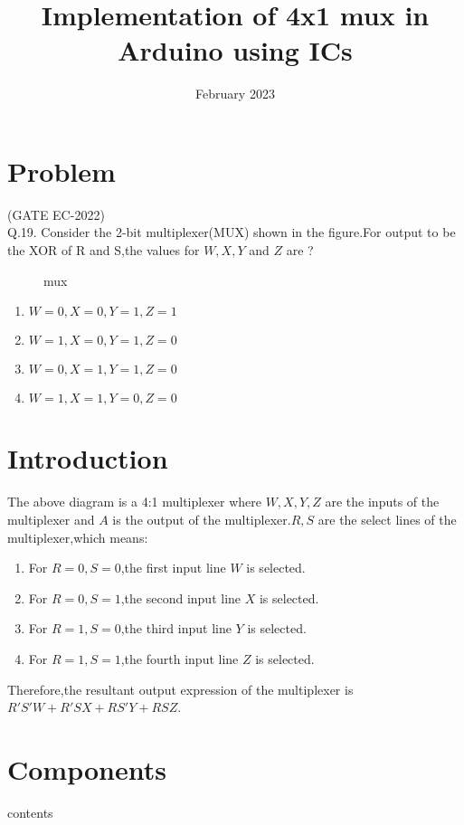 \documentclass[12pt]{article}
\title{Implementation of 4x1 mux in Arduino using ICs}
\date{February 2023}
\begin{document}
\maketitle
\tableofcontents

	 \section{Problem}
	 (GATE EC-2022)\\

Q.19. Consider the 2-bit multiplexer(MUX) shown in the figure.For output to be the XOR of R and S,the values for $ W,X,Y$ and $Z$ are ?\newline
\begin{figure}[h]

\caption{mux}
\label{fig:1}
\end{figure}
\begin{enumerate}
\item $W = 0, X = 0, Y = 1, Z = 1$
\item $W = 1, X = 0, Y = 1, Z = 0$
\item $W = 0, X = 1, Y = 1, Z = 0$
\item $W = 1, X = 1, Y = 0, Z = 0$
\end{enumerate}
\section{Introduction}
	The above diagram is a 4:1 multiplexer where $W, X, Y, Z$ are the inputs of the multiplexer and $A$ is the output of the multiplexer.$R , S$ are the select lines of the multiplexer,which means:\newline
\begin{enumerate}
\item For $R = 0,S = 0$,the first input line $W$ is selected.
\item For $R = 0,S = 1$,the second input line $X$ is selected.
\item For $R = 1,S = 0$,the third input line $Y$ is selected.
\item For $R = 1,S = 1$,the fourth input line $Z$ is selected.
\end{enumerate}
Therefore,the resultant output expression of the multiplexer is $R'S'W + R'SX + RS'Y + RSZ$.
\section{Components}
\begin{table}[h]
	
\caption{contents}
\label{table 1}
\end{table}
	\pagebreak
\end{document}
